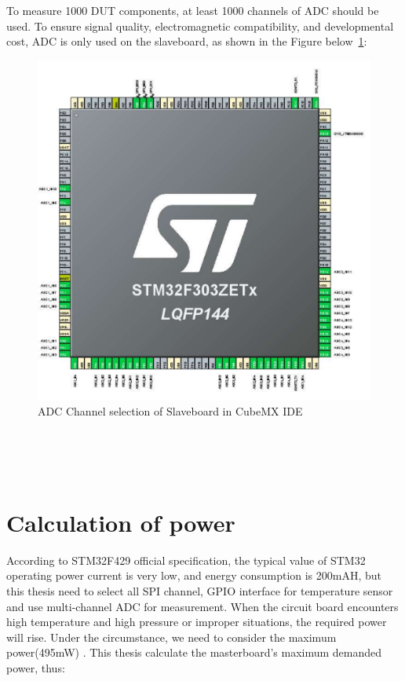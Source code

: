 To measure 1000 DUT components, at least 1000 channels of ADC should be used. To ensure signal quality, electromagnetic compatibility, and developmental cost, ADC is only used on the slaveboard, as shown in the Figure below~\ref{fig:4.3}: 

\begin{figure}[!ht]
	\centering
	\includegraphics[width=16cm]{grafiken/4.3.pdf}
	\caption{ADC Channel selection of Slaveboard in CubeMX IDE} 
	\label{fig:4.3}
\end{figure}
\FloatBarrier
\\

\\
\\
\section{Calculation of power}
\label{sec:Calculation of power}
According to STM32F429 official specification, the typical value of STM32 operating power current is very low, and energy consumption is 200mAH, but this thesis need to select all SPI channel, GPIO interface for temperature sensor and use multi-channel ADC for measurement. When the circuit board encounters high temperature and high pressure or improper situations, the required power will rise. Under the circumstance, we need to consider the maximum power(495mW) \cite{gotz2020benchmarking}. 
This thesis calculate the masterboard’s maximum demanded power, thus:

